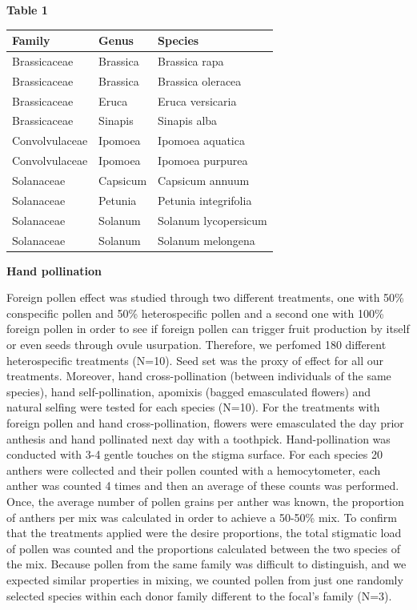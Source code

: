 \documentclass[11pt,a4paper]{article}
\begin{document}
\newpage

\textbf{Table 1}

\begin{longtable}[]{@{}lll@{}}
\toprule
Family & Genus & Species\tabularnewline
\midrule
\endhead
Brassicaceae & Brassica & Brassica rapa\tabularnewline
Brassicaceae & Brassica & Brassica oleracea\tabularnewline
Brassicaceae & Eruca & Eruca versicaria\tabularnewline
Brassicaceae & Sinapis & Sinapis alba\tabularnewline
Convolvulaceae & Ipomoea & Ipomoea aquatica\tabularnewline
Convolvulaceae & Ipomoea & Ipomoea purpurea\tabularnewline
Solanaceae & Capsicum & Capsicum annuum\tabularnewline
Solanaceae & Petunia & Petunia integrifolia\tabularnewline
Solanaceae & Solanum & Solanum lycopersicum\tabularnewline
Solanaceae & Solanum & Solanum melongena\tabularnewline
\bottomrule
\end{longtable}

\newpage

\textbf{Hand pollination}

Foreign pollen effect was studied through two different treatments, one
with 50\% conspecific pollen and 50\% heterospecific pollen and a second
one with 100\% foreign pollen in order to see if foreign pollen can
trigger fruit production by itself or even seeds through ovule
usurpation. Therefore, we perfomed 180 different heterospecific
treatments (N=10). Seed set was the proxy of effect for all our
treatments. Moreover, hand cross-pollination (between individuals of the
same species), hand self-pollination, apomixis (bagged emasculated
flowers) and natural selfing were tested for each species (N=10). For
the treatments with foreign pollen and hand cross-pollination, flowers
were emasculated the day prior anthesis and hand pollinated next day
with a toothpick. Hand-pollination was conducted with 3-4 gentle touches
on the stigma surface. For each species 20 anthers were collected and
their pollen counted with a hemocytometer, each anther was counted 4
times and then an average of these counts was performed. Once, the
average number of pollen grains per anther was known, the proportion of
anthers per mix was calculated in order to achieve a 50-50\% mix. To
confirm that the treatments applied were the desire proportions, the
total stigmatic load of pollen was counted and the proportions
calculated between the two species of the mix. Because pollen from the
same family was difficult to distinguish, and we expected similar
properties in mixing, we counted pollen from just one randomly selected
species within each donor family different to the focal's family (N=3).
\end{document}
